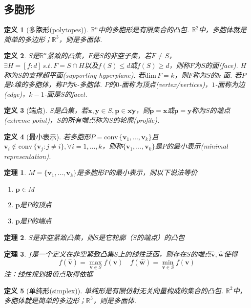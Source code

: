 \documentclass[11pt,UTF8]{ctexart}
\newtheorem{theorem}{定理}
\newtheorem{definition}{定义}
\def\vx{\mathbf{x}}
\def\vy{\mathbf{y}}
\def\vv{\mathbf{v}}
\def\rn{\mathbb{R}^n}
\def\dim{\mathrm{dim}\,}
\def\conv{\mathrm{conv}\,}
\newcommand{\vb}[1]{\mathbf{#1}}
\newcommand{\setenu}[2]{\{#1,\dots,#2\}}
\begin{document}
\subsection{多胞形}
\begin{definition}[多胞形(polytopes)]
$\rn$中的多胞形是有限集合的凸包. $\mathbb{R}^2$中，多胞体就是简单的多边形；$\mathbb{R}^3$，则是多面体.
\end{definition}
\begin{definition}
\rm $S$是$\rn$紧致的凸集，$F$是$S$的非空子集，若$F\ne S$，$\exists H=[f:d]\,s.t.\,F=S\cap H$以及$f(S)\leq d$或$f(S)\geq d$，则称$F$为$S$的面(face). $H$称为$S$的支撑超平面(supporting hyperplane). 若$\dim F=k$，则$F$称为$S$的$k$-面. 若$P$是$k$维的多胞体，称$P$为$k$-多胞体. $P$的$0$-面称为顶点(vertex/vertices)，$1$-面称为边(edge)，$k-1$-面是$S$的facet.
\end{definition}
\begin{definition}[端点]
\rm $S$是凸集，若$\vx,\vy\in S,\vb{p}\in\overline{\vx\vy}$，则$\vb{p}=\vx$或$\vb{p}=\vy$称为$S$的端点(extreme point)，$S$的所有端点称为$S$的轮廓(profile).
\end{definition}
\begin{definition}[最小表示]
\rm 若多胞形$P=\conv\setenu{\vv_1}{\vv_k}$且$\vv_i\notin\conv\{\vv_j:j\ne i\},\forall i=1,\dots,k$，则称$\setenu{\vv_1}{\vv_k}$是$P$的最小表示(minimal representation).
\end{definition}
\begin{theorem}
$M=\setenu{\vv_1}{\vv_k}$是多胞形$P$的最小表示，则以下说法等价
\begin{enumerate}
	\itemsep -3pt
	\item $\vb{p}\in M$
	\item $\vb{p}$是$P$的顶点
	\item $\vb{p}$是$P$的端点
\end{enumerate}
\end{theorem}
\begin{theorem}
$S$是非空紧致凸集，则$S$是它轮廓（$S$的端点）的凸包
\end{theorem}
\begin{theorem}
$f$是一个定义在非空紧致凸集$S$上的线性泛函，则存在$S$的端点$\hat{\vv},\hat{\vb{w}}$使得
\[f(\hat{\vv})=\max_{\vv\in S}f(\vv)\quad f(\hat{\vb{w}})=\min_{\vv\in S}f(\vv)\]
注：线性规划极值点取得依据
\end{theorem}
\begin{definition}[单纯形(simplex)]
单纯形是有限仿射无关向量构成的集合的凸包. $\mathbb{R}^2$中，多胞体就是简单的多边形；$\mathbb{R}^3$，则是多面体.
\end{definition}
\end{document}
